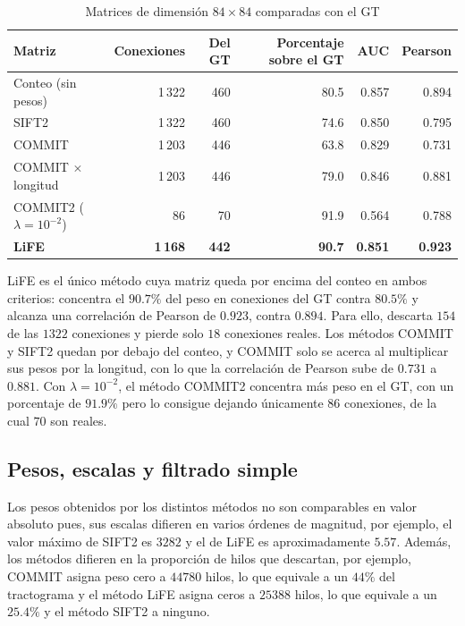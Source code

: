 \documentclass[11pt,a4paper]{article}
\begin{document}
\begin{table}[H]
\centering
\small
\begin{tabularx}{\textwidth}{@{}Xrrrrr@{}}
\toprule
\textbf{Matriz} & \textbf{Conexiones} & \textbf{Del GT} & \textbf{Porcentaje sobre el GT} & \textbf{AUC} & \textbf{Pearson}\\
\midrule
Conteo (sin pesos)         & 1\,322 & 460 & 80.5 & 0.857 & 0.894\\
SIFT2                      & 1\,322 & 460 & 74.6 & 0.850 & 0.795\\
COMMIT                     & 1\,203 & 446 & 63.8 & 0.829 & 0.731\\
COMMIT $\times$ longitud   & 1\,203 & 446 & 79.0 & 0.846 & 0.881\\
COMMIT2 ($\lambda=10^{-2}$)& 86     & 70  & 91.9 & 0.564 & 0.788\\
\textbf{LiFE}              & \textbf{1\,168} & \textbf{442} & \textbf{90.7} & \textbf{0.851} & \textbf{0.923}\\
\bottomrule
\end{tabularx}
\caption{Matrices de dimensión $84\times84$ comparadas con el GT}
\label{tab:matrices}
\end{table}

LiFE es el \'unico método cuya matriz queda por encima del conteo en ambos criterios: concentra el $90.7\%$ del peso en conexiones del GT 
contra $80.5\%$ y alcanza una correlación de Pearson de $0.923$, contra  $0.894$. Para ello, descarta $154$ de las $1322$ conexiones y
pierde solo $18$ conexiones reales. Los métodos COMMIT y SIFT2 quedan por debajo del conteo, y COMMIT solo se
acerca al multiplicar sus pesos por la longitud, con lo que la correlación de Pearson sube de $0.731$ a $0.881$.  Con $\lambda=10^{-2}$, el método 
COMMIT2 concentra más peso en el GT, con un porcentaje de $91.9\%$ pero lo consigue dejando únicamente $86$ conexiones, de la cual $70$ son reales. 
    
\subsection{Pesos, escalas y filtrado simple}

Los pesos obtenidos por los distintos métodos no son comparables en valor absoluto pues, sus escalas difieren en varios órdenes de magnitud, por ejemplo, el valor máximo de SIFT2 es $3282$ y el de LiFE es aproximadamente $5.57$. Además, los métodos difieren en la proporción de hilos que descartan, por ejemplo,  COMMIT asigna peso cero a $44780$ hilos, lo que equivale a un $44 \%$ del tractograma y el método LiFE asigna ceros a $25388$ hilos, lo que equivale a un $25.4 \%$ y el método SIFT2 a ninguno. 
\end{document}
